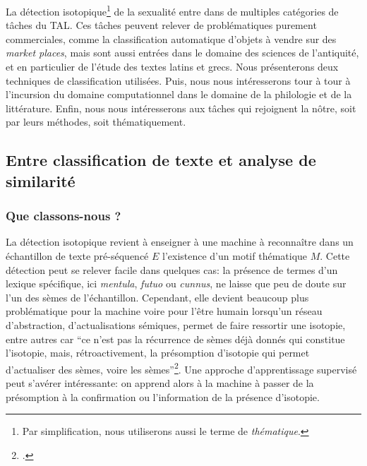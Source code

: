 La détection isotopique\footnote{Par simplification, nous utiliserons aussi le terme de \textit{thématique}.} de la sexualité entre dans de multiples catégories de tâches du TAL. Ces tâches peuvent relever de problématiques purement commerciales, comme la classification automatique d'objets à vendre sur des \textit{market places}, mais sont aussi entrées dans le domaine des sciences de l'antiquité, et en particulier de l'étude des textes latins et grecs. Nous présenterons deux techniques de classification utilisées. Puis, nous nous intéresserons tour à tour à l'incursion du domaine computationnel dans le domaine de la philologie et de la littérature. Enfin, nous nous intéresserons aux tâches qui rejoignent la nôtre, soit par leurs méthodes, soit thématiquement.

\subsection{Entre classification de texte et analyse de similarité}

\subsubsection{Que classons-nous ?}



La détection isotopique revient à enseigner à une machine à reconnaître dans un échantillon de texte pré-séquencé $E$ l'existence d'un motif thématique $M$. Cette détection peut se relever facile dans quelques cas: la présence de termes d'un lexique spécifique, ici \textit{mentula}, \textit{futuo} ou \textit{cunnus}, ne laisse que peu de doute sur l'un des sèmes de l'échantillon. Cependant, elle devient beaucoup plus problématique pour la machine voire pour l'être humain lorsqu'un réseau d'abstraction, d'actualisations sémiques, permet de faire ressortir une isotopie, entre autres car \enquote{ce n'est pas la récurrence de sèmes déjà donnés qui constitue l'isotopie, mais, rétroactivement, la présomption d'isotopie qui permet d'actualiser des sèmes, voire les sèmes}\footcite[p. 34]{rastier_isotopie_1985}. Une approche d'apprentissage supervisé peut s'avérer intéressante: on apprend alors à la machine à passer de la présomption à la confirmation ou l'information de la présence d'isotopie.

